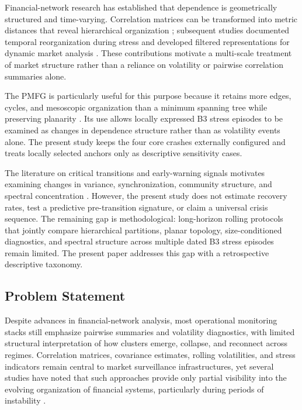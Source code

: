 \documentclass[a4paper,fleqn,review]{cas-sc}
\begin{document}
Financial-network research has established that dependence is geometrically structured and time-varying. Correlation matrices can be transformed into metric distances that reveal hierarchical organization \citep{mantegna1999hierarchical}; subsequent studies documented temporal reorganization during stress and developed filtered representations for dynamic market analysis \citep{onnela2003dynamics,tumminello2005tool,tumminello2007hierarchically,sandoval2015structure}. These contributions motivate a multi-scale treatment of market structure rather than a reliance on volatility or pairwise correlation summaries alone.

The PMFG is particularly useful for this purpose because it retains more edges, cycles, and mesoscopic organization than a minimum spanning tree while preserving planarity \citep{tumminello2005tool,nobi2017systemic}. Its use allows locally expressed B3 stress episodes to be examined as changes in dependence structure rather than as volatility events alone. The present study keeps the four core crashes externally configured and treats locally selected anchors only as descriptive sensitivity cases.

The literature on critical transitions and early-warning signals motivates examining changes in variance, synchronization, community structure, and spectral concentration \citep{scheffer2009earlywarning,billio2012econometric,an2025regimeswitching}. However, the present study does not estimate recovery rates, test a predictive pre-transition signature, or claim a universal crisis sequence. The remaining gap is methodological: long-horizon rolling protocols that jointly compare hierarchical partitions, planar topology, size-conditioned diagnostics, and spectral structure across multiple dated B3 stress episodes remain limited. The present paper addresses this gap with a retrospective descriptive taxonomy.

\subsection{Problem Statement}

Despite advances in financial-network analysis, most operational monitoring stacks still emphasize pairwise summaries and volatility diagnostics, with limited structural interpretation of how clusters emerge, collapse, and reconnect across regimes. Correlation matrices, covariance estimates, rolling volatilities, and stress indicators remain central to market surveillance infrastructures, yet several studies have noted that such approaches provide only partial visibility into the evolving organization of financial systems, particularly during periods of instability \citep{mantegna1999hierarchical,tumminello2010correlation}.
\end{document}
